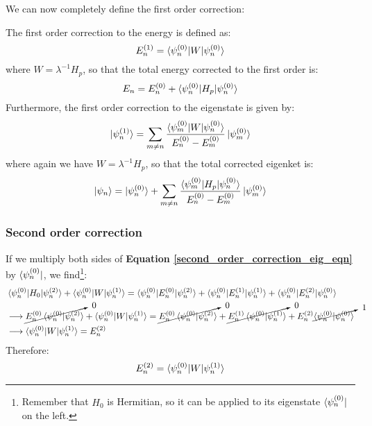 We can now completely define the first order correction:
\begin{definition}
    The first order correction to the energy is defined as:
    \begin{equation}
        E_n^{(1)} = \braket{\psi_n^{(0)}|W|\psi_n^{(0)}}
    \end{equation}
    where $W = \lambda^{-1}H_p$, so that the total energy corrected to the first order is:
    \begin{equation}
        E_n = E_n^{(0)} + \braket{\psi_n^{(0)}|H_p|\psi_n^{(0)}}
    \end{equation}
    Furthermore, the first order correction to the eigenstate is given by:
    \begin{equation} \label{first_order_correction_ket}
        \ket{\psi_n^{(1)}} = \sum_{m\neq n} \frac{\braket{\psi_m^{(0)}|W|\psi_n^{(0)}}}{E_n^{(0)} - E_m^{(0)}}\ket{\psi_m^{(0)}}
    \end{equation}
    where again we have $W = \lambda^{-1}H_p$, so that the total corrected eigenket is:
    \begin{equation}
        \ket{\psi_n} = \ket{\psi_n^{(0)}} + \sum_{m\neq n} \frac{\braket{\psi_m^{(0)}|H_p|\psi_n^{(0)}}}{E_n^{(0)} - E_m^{(0)}}\ket{\psi_m^{(0)}}
    \end{equation}
\end{definition}

\subsubsection{Second order correction}

If we multiply both sides of \textbf{Equation \ref{second_order_correction_eig_eqn}} by $\bra{\psi_n^{(0)}}$, we find\footnote{Remember that $H_0$ is Hermitian, so it can be applied to its eigenstate $\bra{\psi_n^{(0)}}$ on the left.}:
\begin{equation}
    \begin{split}
        &\braket{\psi_n^{(0)}|H_0|\psi_n^{(2)}} + \braket{\psi_n^{(0)}|W|\psi_n^{(1)}} = \braket{\psi_n^{(0)}|E_n^{(0)}|\psi_n^{(2)}} + \braket{\psi_n^{(0)}|E_n^{(1)}|\psi_n^{(1)}} + \braket{\psi_n^{(0)}|E_n^{(2)}|\psi_n^{(0)}}\\
        &\longrightarrow \cancelto{\ 0}{E_n^{(0)}\braket{\psi_n^{(0)}|\psi_n^{(2)}}} + \braket{\psi_n^{(0)}|W|\psi_n^{(1)}} = \cancelto{\ 0}{E_n^{(0)}\braket{\psi_n^{(0)}|\psi_n^{(2)}}} + \cancelto{\ 0}{E_n^{(1)}\braket{\psi_n^{(0)}|\psi_n^{(1)}}} + E_n^{(2)}\cancelto{\ 1}{\braket{\psi_n^{(0)}|\psi_n^{(0)}}}\\
        &\longrightarrow \braket{\psi_n^{(0)}|W|\psi_n^{(1)}} = E_n^{(2)}
    \end{split}
\end{equation}
Therefore:
\begin{equation}
    E_n^{(2)} = \braket{\psi_n^{(0)}|W|\psi_n^{(1)}} 
\end{equation}

